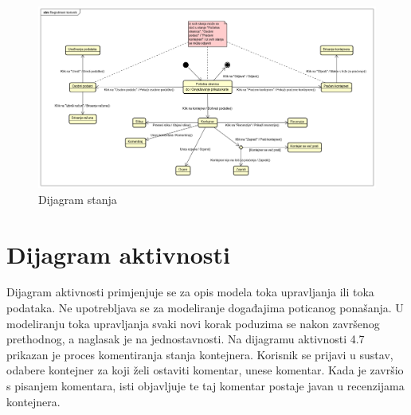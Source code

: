 			\begin{figure}[H]
				\includegraphics[width=1.0\linewidth]{slike/dijagramStanja.png}
				\centering
				\caption{Dijagram stanja}
				\label{fig:dijagramStanja}
			\end{figure}
			
			
			\eject 
		
		\section{Dijagram aktivnosti}
			
			Dijagram  aktivnosti  primjenjuje  se  za  opis  modela  toka  upravljanja  ili  toka  podataka.   Ne upotrebljava se za modeliranje događajima poticanog ponašanja. U modeliranju toka upravljanja svaki novi korak poduzima se nakon završenog prethodnog, a naglasak je na jednostavnosti.  Na dijagramu aktivnosti 4.7 prikazan je proces komentiranja stanja kontejnera. Korisnik se prijavi u sustav, odabere kontejner za koji želi ostaviti komentar, unese komentar. Kada je završio s pisanjem komentara, isti objavljuje te taj komentar postaje javan u recenzijama kontejnera.
			
